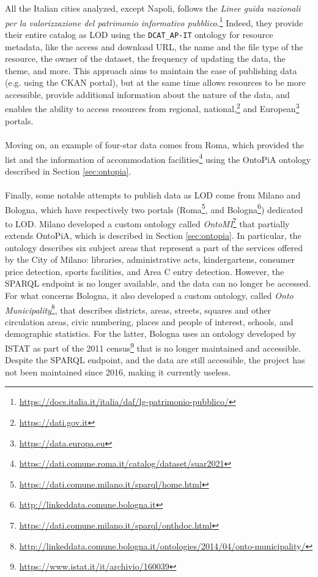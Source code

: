 All the Italian cities analyzed, except Napoli, follows the \textit{Linee guida nazionali per la valorizzazione del patrimonio informativo pubblico}.\footnote{\url{https://docs.italia.it/italia/daf/lg-patrimonio-pubblico/}} Indeed, they provide their entire catalog as \acl{LOD} using the \verb#DCAT_AP-IT# ontology for resource metadata, like the access and download \acs{URL}, the name and the file type of the resource, the owner of the dataset, the frequency of updating the data, the theme, and more. This approach aims to maintain the ease of publishing data (e.g. using the CKAN portal), but at the same time allows resources to be more accessible, provide additional information about the nature of the data, and enables the ability to access resources from regional, national,\footnote{\url{https://dati.gov.it}} and European\footnote{\url{https://data.europa.eu}} portals.

\paragraph*{}
Moving on, an example of four-star data comes from Roma, which provided the list and the information of accommodation facilities\footnote{\url{https://dati.comune.roma.it/catalog/dataset/suar2021}} using the OntoPiA ontology described in Section \ref{sec:ontopia}.

\paragraph*{}
Finally, some notable attempts to publish data as \acl{LOD} come from Milano and Bologna, which have respectively two portals (Roma\footnote{\url{https://dati.comune.milano.it/sparql/home.html}}, and Bologna\footnote{\url{http://linkeddata.comune.bologna.it}}) dedicated to \acl{LOD}. Milano developed a custom ontology called \textit{OntoMI}\footnote{\url{https://dati.comune.milano.it/sparql/onthdoc.html}} that partially extends OntoPiA, which is described in Section \ref{sec:ontopia}. In particular, the ontology describes six subject areas that represent a part of the services offered by the City of Milano: libraries, administrative acts, kindergartens, consumer price detection, sports facilities, and Area C entry detection. However, the \ac{SPARQL} endpoint is no longer available, and the data can no longer be accessed. For what concerns Bologna, it also developed a custom ontology, called \textit{Onto Municipality}\footnote{\url{http://linkeddata.comune.bologna.it/ontologies/2014/04/onto-municipality/}}, that describes districts, areas, streets, squares and other circulation areas, civic numbering, places and people of interest, schools, and demographic statistics. For the latter, Bologna uses an ontology developed by ISTAT as part of the 2011 census\footnote{\url{https://www.istat.it/it/archivio/160039}} that is no longer maintained and accessible. Despite the \ac{SPARQL} endpoint, and the data are still accessible, the project has not been maintained since 2016, making it currently useless.